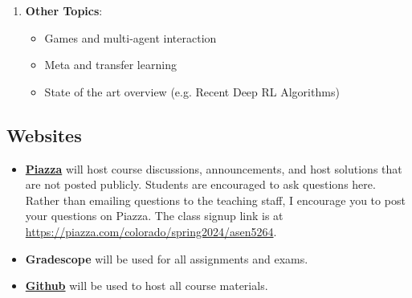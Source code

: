\documentclass[9pt]{article}
\begin{document}
\begin{enumerate}[noitemsep]
\begin{multicols}{2}
        \begin{itemize}[noitemsep]
            \item Hidden Markov models
            \item Bayesian filters
            \item Particle filters
            \item Partially observable Markov decision processes (POMDPs)
            \item Exact POMDP methods
            \item Offline POMDP methods
            \item Online POMDP methods
            \item QMDP
        \end{itemize}
        \end{multicols}
    \item \textbf{Other Topics}:
        \begin{multicols}{2}
        \begin{itemize}[noitemsep]
            \item Games and multi-agent interaction
            \item Meta and transfer learning
            \item State of the art overview (e.g. Recent Deep RL Algorithms)
        \end{itemize}
        \end{multicols}
\end{enumerate}

\begin{samepage}
\section*{Websites}

\begin{itemize}[nosep]
    \item \href{https://piazza.com}{\textbf{Piazza}} will host course discussions, announcements, and host solutions that are not posted publicly. Students are encouraged to ask questions here. Rather than emailing questions to the teaching staff, I encourage you to post your questions on Piazza. The class signup link is at \url{https://piazza.com/colorado/spring2024/asen5264}.
    \item \textbf{Gradescope} will be used for all assignments and exams.
    \item \href{https://github.com/CU-ADCL/CU-DMU-Materials}{\textbf{Github}} will be used to host all course materials.
\end{itemize}

\end{samepage}
\end{document}

